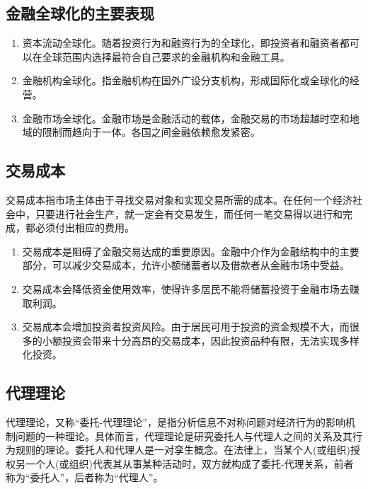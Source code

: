 \documentclass{article}
\begin{document}
\subsection{金融全球化的主要表现}

\begin{enumerate}
	\item 资本流动全球化。随着投资行为和融资行为的全球化，即投资者和融资者都可以在全球范围内选择最符合自己要求的金融机构和金融工具。
	\item 金融机构全球化。指金融机构在国外广设分支机构，形成国际化或全球化的经营。
	\item 金融市场全球化。金融市场是金融活动的载体，金融交易的市场超越时空和地域的限制而趋向于一体。各国之间金融依赖愈发紧密。    
\end{enumerate}

\subsection{交易成本}
交易成本指市场主体由于寻找交易对象和实现交易所需的成本。在任何一个经济社会中，只要进行社会生产，就一定会有交易发生，而任何一笔交易得以进行和完成，都必须付出相应的费用。

\begin{enumerate}
      \item 交易成本是阻碍了金融交易达成的重要原因。金融中介作为金融结构中的主要部分，可以减少交易成本，允许小额储蓄者以及借款者从金融市场中受益。
      \item 交易成本会降低资金使用效率，使得许多居民不能将储蓄投资于金融市场去赚取利润。
      \item 交易成本会增加投资者投资风险。由于居民可用于投资的资金规模不大，而很多的小额投资会带来十分高昂的交易成本，因此投资品种有限，无法实现多样化投资。
\end{enumerate}
\subsection{代理理论}

代理理论，又称“委托-代理理论”，是指分析信息不对称问题对经济行为的影响机制问题的一种理论。具体而言，代理理论是研究委托人与代理人之间的关系及其行为规则的理论。委托人和代理人是一对孪生概念。在法律上，当某个人(或组织)授权另一个人(或组织)代表其从事某种活动时，双方就构成了委托-代理关系，前者称为“委托人”，后者称为“代理人”。
\end{document}
